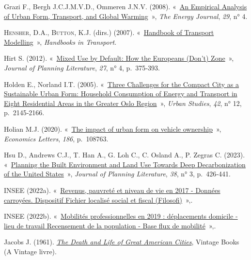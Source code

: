 \documentclass[
  9pt,
  a4paper,
  DIV=11]{scrreprt}
\newlength{\cslhangindent}
\newenvironment{CSLReferences}[2] %
 {\begin{list}{}{%
  \setlength{\itemindent}{0pt}
  \setlength{\leftmargin}{0pt}
  \setlength{\parsep}{0pt}
  \ifodd #1
   \setlength{\leftmargin}{\cslhangindent}
   \setlength{\itemindent}{-1\cslhangindent}
  \fi
  \setlength{\itemsep}{#2\baselineskip}}}
 {\end{list}}
\begin{document}
\begin{CSLReferences}{0}{1}
Grazi F., Bergh J.C.J.M.V.D., Ommeren J.N.V. (2008).
{«~\href{https://doi.org/10.5547/ISSN0195-6574-EJ-Vol29-No4-5}{An
Empirical Analysis of Urban Form, Transport, and Global Warming}~»},
\emph{The Energy Journal}, \emph{29}, n° 4.

\textsc{Hensher, D.A.}, \textsc{Button, K.J.} (dirs.) (2007).
{«~\href{https://doi.org/10.1108/9780857245670}{Handbook of Transport
Modelling}~»}, \emph{Handbooks in Transport}.

Hirt S. (2012). {«~\href{https://doi.org/10.1177/0885412212451029}{Mixed
Use by Default: How the Europeans (Don{'}t) Zone}~»}, \emph{Journal of
Planning Literature}, \emph{27}, n° 4, p.~375‑393.

Holden E., Norland I.T. (2005).
{«~\href{https://doi.org/10.1080/00420980500332064}{Three Challenges for
the Compact City as a Sustainable Urban Form: Household Consumption of
Energy and Transport in Eight Residential Areas in the Greater Oslo
Region}~»}, \emph{Urban Studies}, \emph{42}, n° 12, p.~2145‑2166.

Holian M.J. (2020).
{«~\href{https://doi.org/10.1016/j.econlet.2019.108763}{The impact of
urban form on vehicle ownership}~»}, \emph{Economics Letters},
\emph{186}, p.~108763.

Hsu D., Andrews C.J., T. Han A., G. Loh C., C. Osland A., P. Zegras C.
(2023). {«~\href{https://doi.org/10.1177/08854122221097977}{Planning the
Built Environment and Land Use Towards Deep Decarbonization of the
United States}~»}, \emph{Journal of Planning Literature}, \emph{38}, n°
3, p.~426‑441.

INSEE (2022a).
{«~\href{https://www.insee.fr/fr/statistiques/6214811?sommaire=6215217}{Revenus,
pauvreté et niveau de vie en 2017 - Données carroyées. Dispositif
Fichier localisé social et fiscal (Filosofi)}~»},.

INSEE (2022b).
{«~\href{https://www.insee.fr/fr/statistiques/6454112}{Mobilités
professionnelles en 2019 : déplacements domicile - lieu de travail
Recensement de la population - Base flux de mobilité}~»},.

Jacobs J. (1961).
\emph{\href{https://books.google.fr/books?id=5FdHAAAAMAAJ}{The Death and
Life of Great American Cities}}, Vintage Books (A Vintage livre).


\end{CSLReferences}
\end{document}
